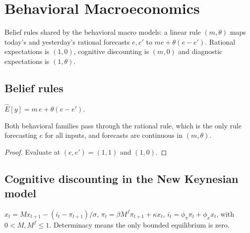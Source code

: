 \chapter{Behavioral Macroeconomics}
\label{chap:behavioral-macro}

Belief rules shared by the behavioral macro models: a linear rule $(m,\theta)$ maps today's and yesterday's rational
forecasts $e,e'$ to $me+\theta(e-e')$. Rational expectations is $(1,0)$, cognitive discounting is $(m,0)$ and
diagnostic expectations is $(1,\theta)$.

\section{Belief rules}

\begin{definition}
\label{def:bm-belief-rule}
\leanok
$\hat E[y]=m\,e+\theta(e-e')$.
\end{definition}

\begin{lemma}
\label{lem:bm-belief-rule}
\leanok
Both behavioral families pass through the rational rule, which is the only rule forecasting $e$ for all inputs,
and forecasts are continuous in $(m,\theta)$.
\end{lemma}
\begin{proof}
\leanok
Evaluate at $(e,e')=(1,1)$ and $(1,0)$.
\end{proof}

\section{Cognitive discounting in the New Keynesian model}

\begin{definition}
\label{def:bm-cnk}
\leanok
$x_t=Mx_{t+1}-(i_t-\pi_{t+1})/\sigma$, $\pi_t=\beta M^f\pi_{t+1}+\kappa x_t$, $i_t=\phi_\pi\pi_t+\phi_x x_t$, with
$0<M,M^f\le1$. Determinacy means the only bounded equilibrium is zero.
\end{definition}

